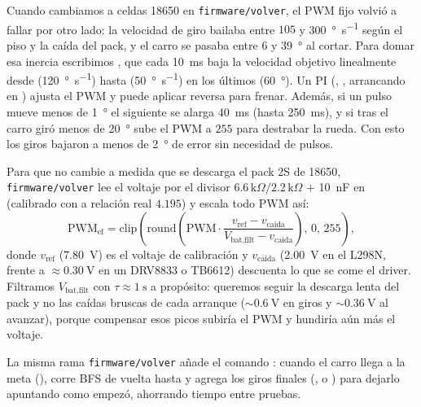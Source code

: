 Cuando cambiamos a celdas 18650 en \texttt{firmware/volver}, el PWM fijo volvió a fallar por otro lado: la velocidad de giro bailaba entre $105$ y \SI{300}{\degree\per\second} según el piso y la caída del pack, y el carro se pasaba entre $6$ y \SI{39}{\degree} al cortar. Para domar esa inercia escribimos , que cada \SI{10}{\milli\second} baja la velocidad objetivo linealmente desde  (\SI{120}{\degree\per\second}) hasta  (\SI{50}{\degree\per\second}) en los últimos  (\SI{60}{\degree}). Un PI (, , arrancando en ) ajusta el PWM y puede aplicar reversa para frenar. Además, si un pulso mueve menos de \SI{1}{\degree} el siguiente se alarga \SI{40}{\milli\second} (hasta \SI{250}{\milli\second}), y si tras  el carro giró menos de \SI{20}{\degree} sube el PWM a $255$ para destrabar la rueda. Con esto los giros bajaron a menos de \SI{2}{\degree} de error sin necesidad de pulsos.

\begin{hallazgo}
Para que  no cambie a medida que se descarga el pack 2S de 18650, \texttt{firmware/volver} lee el voltaje por el divisor $6.6\,\text{k}\Omega / 2.2\,\text{k}\Omega$ + \SI{10}{\nano\farad} en  (calibrado con  a relación real $4.195$) y escala todo PWM así:
\begin{equation}
  \text{PWM}_{\text{ef}} = \mathrm{clip}\!\left(\mathrm{round}\!\left(\text{PWM} \cdot \frac{v_{\text{ref}} - v_{\text{caida}}}{V_{\text{bat,filt}} - v_{\text{caida}}}\right),\, 0,\, 255\right),
  \label{eq:comp-bateria}
\end{equation}
donde $v_{\text{ref}}$ (\SI{7.80}{\volt}) es el voltaje de calibración y $v_{\text{caida}}$ (\SI{2.00}{\volt} en el L298N, frente a $\approx\SI{0.30}{\volt}$ en un DRV8833 o TB6612) descuenta lo que se come el driver. Filtramos $V_{\text{bat,filt}}$ con $\tau \approx \SI{1}{\second}$ a propósito: queremos seguir la descarga lenta del pack y no las caídas bruscas de cada arranque ($\sim\SI{0.6}{\volt}$ en giros y $\sim\SI{0.36}{\volt}$ al avanzar), porque compensar esos picos subiría el PWM y hundiría aún más el voltaje.
\end{hallazgo}

La misma rama \texttt{firmware/volver} añade el comando : cuando el carro llega a la meta (),  corre BFS de vuelta hasta  y agrega los giros finales (,  o ) para dejarlo apuntando como empezó, ahorrando tiempo entre pruebas.


